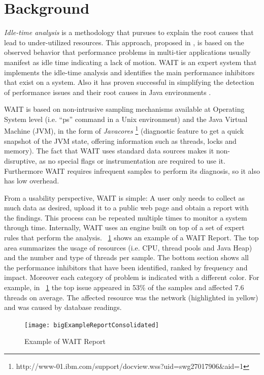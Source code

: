 \documentclass[runningheads,a4paper]{llncs}
\begin{document}
\section{Background}
\label{Background}
\vspace{-5pt}
\emph{Idle-time analysis} is a methodology that pursues to explain the root
causes that lead to under-utilized resources. This approach, proposed in
\cite{Altman2010}, is based on the observed behavior that performance problems in multi-tier
applications usually manifest as idle time indicating a lack of motion.
WAIT is an expert system that implements the idle-time analysis and identifies
the main performance inhibitors that exist on a system. Also it has proven
successful in simplifying the detection of performance issues and their root causes in Java
environments \cite{Altman2010,Wu1}.

WAIT is based on non-intrusive sampling mechanisms available at
Operating System level (i.e. ``ps'' command in a Unix environment) and the Java
Virtual Machine (JVM), in the form of \emph{Javacores}
\footnote{http://www-01.ibm.com/support/docview.wss?uid=swg27017906\&aid=1}
(diagnostic feature to get a quick snapshot of the JVM state, offering
information such as threads, locks and memory). The fact that WAIT uses standard
data sources makes it non-disruptive, as no special flags or instrumentation are
required to use it. Furthermore WAIT requires infrequent samples to perform its
diagnosis, so it also has low overhead.

From a usability perspective, WAIT is simple: A user only needs to
collect as much data as desired, upload it to a public web page and obtain a
report with the findings. This process can be repeated multiple times to monitor a
system through time. Internally, WAIT uses an engine built on top of a set of 
expert rules that perform the analysis. \figurename ~\ref{fig_WAITReport} shows an
example of a WAIT Report. The top area summarizes the usage of resources (i.e.
CPU, thread pools and Java Heap) and the number and type of threads per sample. 
The bottom section shows all the performance inhibitors that have been identified, ranked
by frequency and impact. Moreover each category of problem is indicated with a
different color. For example, in \figurename ~\ref{fig_WAITReport} the top issue
appeared in 53\% of the samples and affected 7.6 threads on average. The
affected resource was the network (highlighted in yellow) and was caused by
database readings.

\begin{figure}[!h]
\centering
\texttt{[image: bigExampleReportConsolidated]}
\caption{Example of WAIT Report}
\label{fig_WAITReport}
\end{figure}
\end{document}
